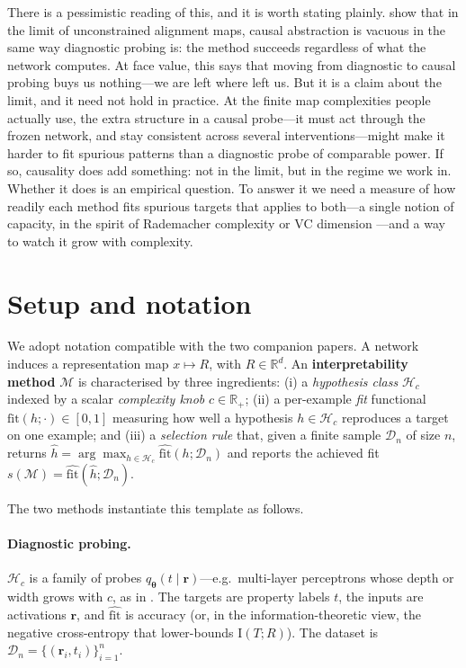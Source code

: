 \documentclass[11pt]{article}
\newcommand{\R}{R}                       %
\newcommand{\T}{T}                       %
\newcommand{\hypclass}{\mathcal{H}}      %
\newcommand{\complexity}{c}              %
\newcommand{\fit}{\mathrm{fit}}
\begin{document}
There is a pessimistic reading of this, and it is worth stating plainly.
\citet{sutter2025nonlinear} show that in the limit of unconstrained alignment maps,
causal abstraction is vacuous in the same way diagnostic probing is: the method
succeeds regardless of what the network computes. At face value, this says that moving
from diagnostic to causal probing buys us nothing---we are left where
\citet{pimentel2020information} left us. But it is a claim about the limit, and it need
not hold in practice. At the finite map complexities people actually use, the extra
structure in a causal probe---it must act through the frozen network, and stay
consistent across several interventions---might make it harder to fit spurious
patterns than a diagnostic probe of comparable power. If so, causality does add
something: not in the limit, but in the regime we work in. Whether it does is an
empirical question. To answer it we need a measure of how readily each method fits
spurious targets that applies to both---a single notion of capacity, in the spirit of
Rademacher complexity \citep{bartlett2002rademacher} or VC dimension
\citep{vapnik1998statistical}---and a way to watch it grow with complexity.

\section{Setup and notation}\label{sec:setup}

We adopt notation compatible with the two companion papers. A network induces a
representation map $x \mapsto \R$, with $\R \in \mathbb{R}^{d}$. An
\textbf{interpretability method} $\mathcal{M}$ is characterised by three
ingredients: (i) a \emph{hypothesis class} $\hypclass_{\complexity}$ indexed by a
scalar \emph{complexity knob} $\complexity \in \mathbb{R}_{+}$; (ii) a per-example
\emph{fit} functional $\fit(h; \cdot) \in [0,1]$ measuring how well a hypothesis
$h \in \hypclass_{\complexity}$ reproduces a target on one example; and (iii) a
\emph{selection rule} that, given a finite sample $\mathcal{D}_n$ of size $n$,
returns $\hat h = \arg\max_{h \in \hypclass_{\complexity}}
\widehat{\fit}(h; \mathcal{D}_n)$ and reports the achieved fit
$s(\mathcal{M}) = \widehat{\fit}(\hat h; \mathcal{D}_n)$.

The two methods instantiate this template as follows.

\paragraph{Diagnostic probing.} $\hypclass_{\complexity}$ is a family of probes
$q_{\bm\theta}(t \mid \mathbf r)$---e.g.\ multi-layer perceptrons whose depth or
width grows with $\complexity$, as in \citet{pimentel2020information}. The targets
are property labels $t$, the inputs are activations $\mathbf r$, and
$\widehat{\fit}$ is accuracy (or, in the information-theoretic view, the negative
cross-entropy that lower-bounds $\mathrm{I}(\T;\R)$). The dataset is
$\mathcal{D}_n = \{(\mathbf r_i, t_i)\}_{i=1}^n$.
\end{document}
